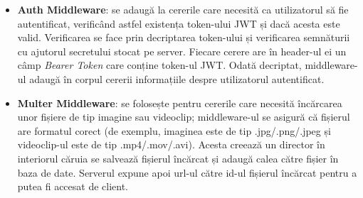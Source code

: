 \begin{itemize}
    \item \textbf{Auth Middleware}: se adaugă la cererile care necesită ca utilizatorul să fie
    autentificat, verificând astfel existența token-ului JWT și dacă acesta este valid. Verificarea
    se face prin decriptarea token-ului și verificarea semnăturii cu ajutorul secretului stocat
    pe server. Fiecare cerere are în header-ul ei un câmp \textit{Bearer Token} care conține
    token-ul JWT. Odată decriptat, middleware-ul adaugă în corpul cererii informațiile despre
    utilizatorul autentificat.
    \item \textbf{Multer Middleware}: se folosește pentru cererile care necesită încărcarea unor
    fișiere de tip imagine sau videoclip; middleware-ul se asigură că fișierul are formatul corect
    (de exemplu, imaginea este de tip .jpg/.png/.jpeg și videoclip-ul este de tip .mp4/.mov/.avi).
    Acesta creează un director în interiorul căruia se salvează fișierul încărcat și adaugă
    calea către fișier în baza de date. Serverul expune apoi url-ul către id-ul fișierul încărcat
    pentru a putea fi accesat de client.
    
\end{itemize}

